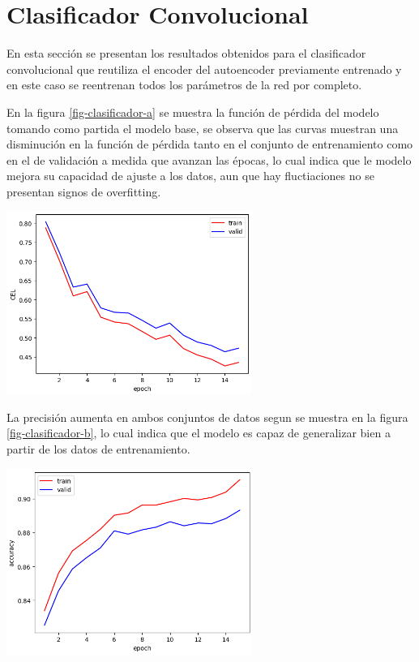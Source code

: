 \documentclass[aps,prl,reprint,groupedaddress]{revtex4-2}
\newenvironment{Figura}
  {\par\medskip\noindent\minipage{\linewidth}}
  {\endminipage\par\medskip}
\begin{document}
\section{Clasificador Convolucional}

En esta sección se presentan los resultados obtenidos para el clasificador
convolucional que reutiliza el encoder del autoencoder previamente entrenado y 
en este caso se reentrenan todos los parámetros de la red por completo.

En la figura \ref{fig-clasificador-a} se muestra la función de pérdida del
modelo tomando como partida el modelo base, se observa que las curvas muestran
una disminución en la función de pérdida tanto en el conjunto de entrenamiento
como en el de validación a medida que avanzan las épocas, lo cual indica que le
modelo mejora su capacidad de ajuste a los datos, aun que hay fluctiaciones 
no se presentan signos de overfitting.

\begin{Figura}
  \centering
  \includegraphics[width=0.60\textwidth]{figs/modelo_con_clasificador_a.png}
  \label{fig-clasificador-a}
\end{Figura}

La precisión aumenta en ambos conjuntos de datos segun se muestra en la figura
\ref{fig-clasificador-b}, lo cual indica que el modelo es capaz de generalizar
bien a partir de los datos de entrenamiento.

\begin{Figura}
  \centering
  \includegraphics[width=0.60\textwidth]{figs/modelo_con_clasificador_b.png}
  \label{fig-clasificador-b}
\end{Figura}
\end{document}
